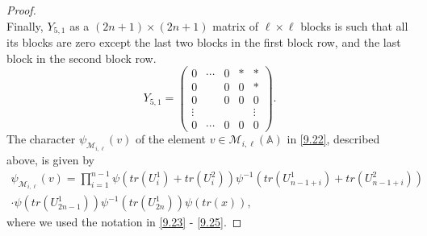 \documentclass[12pts]{amsart}
\newcommand{\BA}{{\mathbb {A}}}
\begin{document}
\begin{proof}
\begin{equation}
\end{equation}
Finally, $Y_{5,1}$ as a $(2n+1)\times (2n+1)$ matrix of $\ell\times \ell$ blocks is such that all its blocks are zero except the last two blocks in the first block row, and the last block in the second block row.
\begin{equation}\label{9.33}
Y_{5,1}=\begin{pmatrix}0&\cdots&0&\ast&\ast\\0&&0&0&\ast\\0&&0&0&0\\\vdots&&&&\vdots\\0&\cdots&0&0&0\end{pmatrix}.
\end{equation}
The character $\psi_{\mathcal{M}_{i,\ell}}(v)$ of the element $v\in \mathcal{M}_{i,\ell}(\BA)$ in \eqref{9.22}, described above, is given by
\begin{multline}\label{9.34}
 \psi_{\mathcal{M}_{i,\ell}}(v)=\prod_{i=1}^{n-1}\psi(tr(U^1_i)+tr(U^2_i))\psi^{-1}(tr(U^1_{n-1+i})+tr(U^2_{n-1+i}))\\
 \cdot\psi(tr(U^1_{2n-1}))\psi^{-1}(tr(U^1_{2n}))\psi(tr(x)),
 \end{multline}
 where we used the notation in \eqref{9.23} - \eqref{9.25}.
 

\end{proof}
\end{document}
